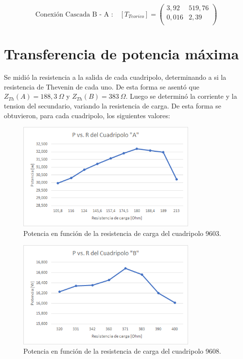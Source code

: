\documentclass[a4paper]{article}
\begin{document}
\begin{equation}
\text{Conexión Cascada B - A :}\quad [T_{Teorico}] =
\left( \begin{array}{cc}
	3,92 & 519,76\\
	0,016 & 2,39\\
\end{array} \right)
\end{equation}

\section*{Transferencia de potencia máxima}
Se midió la resistencia a la salida de cada cuadripolo, determinando a si la resistencia de Thevenin de cada uno. De esta forma se asentó que $Z_{Th}(A) = 188,3 \ \Omega$ y $Z_{Th}(B) = 383 \ \Omega$. Luego se determinó la corriente y la tension del secundario, variando la resistencia de carga. De esta forma se obtuvieron, para cada cuadripolo, los siguientes valores:

\begin{figure}[H]
	\centering
	\includegraphics[width=0.8\textwidth]{Potencia-A}
	\caption{Potencia en función de la resistencia de carga del cuadripolo 9603.}
	\label{fig:PA}
\end{figure}

\begin{figure}[H]
	\centering
	\includegraphics[width=0.8\textwidth]{Potencia-B}
	\caption{Potencia en función de la resistencia de carga del cuadripolo 9608.}
	\label{fig:PB}
\end{figure}
\end{document}
